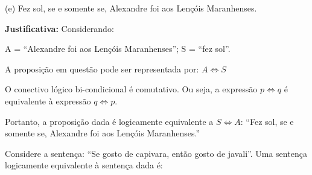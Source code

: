 \documentclass[12pt,letterpaper, onecolumn]{exam}
\begin{document}
\begin{questions}

    \begin{solution}
        (e) Fez sol, se e somente se, Alexandre foi aos Lençóis Maranhenses.

        \textbf{Justificativa:} Considerando:

        A = “Alexandre foi aos Lençóis Maranhenses”; \hfill 
        S = “fez sol”.

        A proposição em questão pode ser representada por: \( A \iff S\)
        
        O conectivo lógico bi-condicional é comutativo. Ou seja, a expressão \( p \iff q \) é equivalente à expressão \( q \iff p \).
        
        Portanto, a proposição dada é logicamente equivalente a \( S \iff A \): “Fez sol, se e somente se, Alexandre foi aos Lençóis Maranhenses.”
        \end{solution}

    \question[q12] Considere a sentença: “Se gosto de capivara, então gosto de javali”. Uma sentença logicamente equivalente à sentença dada é: 
    
\end{questions}
\end{document}
